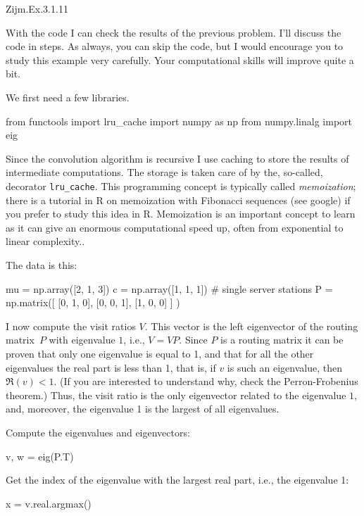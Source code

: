 \begin{exercise}
Zijm.Ex.3.1.11
\begin{solution}
  With the code I can check the results of the previous problem.  I'll
  discuss the code in steps. As always, you can skip the code, but I
  would encourage you to study this example very carefully. Your
  computational skills will improve quite a bit. 

We first need a few libraries. 

\begin{pyconsole}
from functools import lru_cache
import numpy as np
from numpy.linalg import eig
  
\end{pyconsole}

Since the convolution algorithm is recursive I use caching to store
the results of intermediate computations. The storage is taken care of
by the, so-called, decorator \texttt{lru\_cache}. This programming
concept is typically called \emph{memoization}; there is a tutorial in
R on memoization with Fibonacci sequences (see google) if you prefer
to study this idea in R. Memoization is an important concept to learn
as it can give an enormous computational speed up, often from
exponential to linear complexity..

The data is this:

\begin{pyconsole}
mu = np.array([2, 1, 3])
c = np.array([1, 1, 1]) # single server stations
P = np.matrix([
    [0, 1, 0],
    [0, 0, 1],
    [1, 0, 0]
]
)
  
\end{pyconsole}

I now compute the visit ratios $V$. This vector is the left
eigenvector of the routing matrix~$P$ with eigenvalue $1$, i.e.,
$V=VP$. Since $P$ is a routing matrix it can be proven that only one
eigenvalue is equal to 1, and that for all the other eigenvalues the
real part is less than 1, that is, if $v$ is such an eigenvalue, then
$\Re(v) < 1$. (If you are interested to understand why, check
the Perron-Frobenius theorem.) Thus, the visit ratio is the only
eigenvector related to the eigenvalue $1$, and, moreover, the
eigenvalue 1 is the largest of all eigenvalues.

Compute the eigenvalues and eigenvectors:

\begin{pyconsole}
v, w = eig(P.T)
\end{pyconsole}

Get the index of the  eigenvalue with the largest real part, i.e., the  eigenvalue 1:
\begin{pyconsole}
x = v.real.argmax() 
\end{pyconsole}


\end{solution}
\end{exercise}
